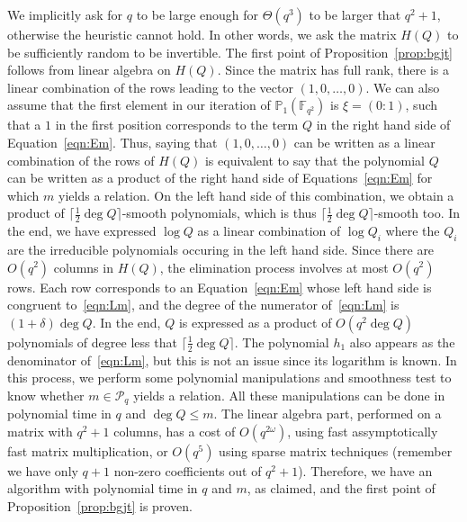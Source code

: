 \documentclass[a4paper,11pt]{article}
\theoremstyle{break}
\theoremstyle{sc}
\theoremstyle{definition}
\theoremstyle{remark}
\begin{document}
We implicitly ask for $q$ to be large enough for $\Theta(q^3)$ to be larger that
$q^2+1$, otherwise the heuristic cannot hold. In other words, we ask the matrix
$H(Q)$ to be sufficiently random to be invertible. The first point of
Proposition~\ref{prop:bgjt} follows from linear algebra on $H(Q)$. Since the
matrix has full rank, there is a linear combination of the rows leading to the
vector $(1, 0, \dots, 0)$. We can also assume that the first element in our
iteration of $\mathbb{P}_1(\mathbb{F}_{q^2})$ is $\xi=(0:1)$, such that a $1$ in
the first position corresponds to the term $Q$ in the right hand side of
Equation~\eqref{eqn:Em}. Thus, saying that $(1, 0, \dots, 0)$ can be written as
a linear combination of the rows of $H(Q)$ is equivalent to say that the
polynomial $Q$ can be written as a product of the right hand side of
Equations~\eqref{eqn:Em} for which $m$ yields a relation. On the left hand side
of this combination, we obtain a product of $\lceil\frac{1}{2}\deg Q\rceil$-smooth
polynomials, which is thus $\lceil\frac{1}{2}\deg Q\rceil$-smooth too. In the end, we
have expressed $\log Q$ as a linear combination of $\log Q_i$ where the $Q_i$
are the irreducible polynomials occuring in the left hand side. Since there are
$O(q^2)$ columns in $H(Q)$, the elimination process involves at most
$O(q^2)$ rows. Each row corresponds to an Equation~\eqref{eqn:Em} whose left
hand side is congruent to~\eqref{eqn:Lm}, and the degree of the numerator
of~\eqref{eqn:Lm} is $(1+\delta)\deg Q$. In the end, $Q$ is expressed as a product
of $O(q^2\deg Q)$ polynomials of degree less that $\lceil\frac{1}{2}\deg
Q\rceil$. The polynomial $h_1$ also appears as the denominator
of~\eqref{eqn:Lm}, but this is not an issue since its logarithm is known. In
this process, we perform some polynomial manipulations and smoothness test to
know whether $m\in\mathcal P_q$ yields a relation. All these manipulations can
be done in polynomial time in $q$ and $\deg Q\leq m$. The linear algebra part,
performed on a matrix with $q^2+1$ columns, has a cost of $O(q^{2\omega})$,
using fast assymptotically fast matrix multiplication, or $O(q^5)$ using sparse
matrix techniques (remember we have only $q+1$ non-zero coefficients out of
$q^2+1$). Therefore, we have an algorithm with polynomial time in $q$ and $m$, as
claimed, and the first point of Proposition~\ref{prop:bgjt} is proven.
\end{document}
